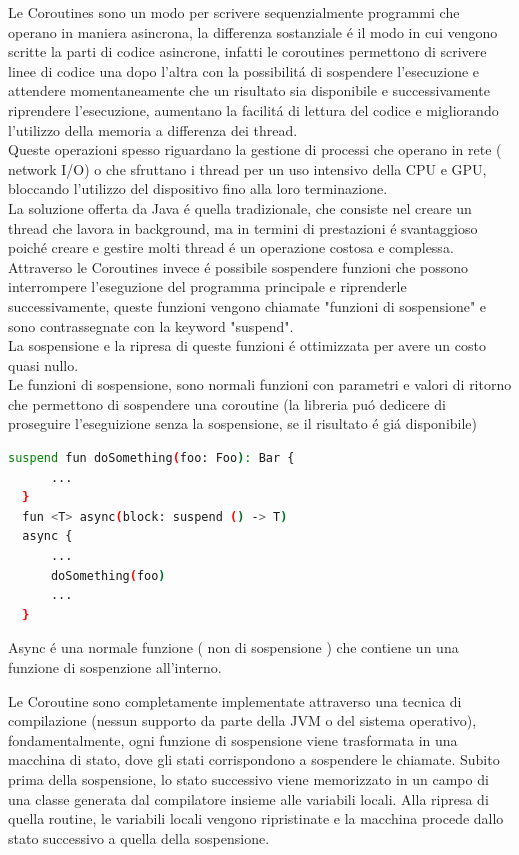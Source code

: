 Le Coroutines sono un modo per scrivere sequenzialmente programmi che operano in maniera asincrona, la differenza sostanziale \'e il modo in cui vengono scritte la parti di codice asincrone, infatti le coroutines permettono di scrivere linee di codice una dopo l'altra con la possibilit\'a di sospendere l'esecuzione e attendere momentaneamente che un risultato sia disponibile e successivamente riprendere l'esecuzione, aumentano la facilit\'a di lettura del codice e migliorando l'utilizzo della memoria a differenza dei thread.\\
Queste operazioni spesso riguardano la gestione di processi che operano in rete ( network I/O) o che sfruttano i thread per un uso intensivo della CPU e GPU, bloccando l'utilizzo del dispositivo fino alla loro terminazione.\\
La soluzione offerta da Java \'e quella tradizionale, che consiste nel creare un thread che lavora in background, ma in termini di prestazioni \'e svantaggioso poich\'e creare e gestire molti thread \'e un operazione costosa e complessa.\\
Attraverso le Coroutines invece \'e possibile sospendere funzioni che possono interrompere l'eseguzione del programma principale e riprenderle successivamente, queste funzioni vengono chiamate "funzioni di sospensione" e sono contrassegnate con la keyword "suspend".\\
La sospensione e la ripresa di queste funzioni \'e ottimizzata per avere un costo quasi nullo.\\

Le funzioni di sospensione, sono normali funzioni con parametri e valori di ritorno che permettono di sospendere una coroutine (la libreria pu\'o dedicere di proseguire l'eseguizione senza la sospensione, se il risultato \'e gi\'a disponibile)

\begin{lstlisting}[language=bash,caption={Grandle Coroutines }]
  suspend fun doSomething(foo: Foo): Bar {
      ...
  }
  fun <T> async(block: suspend () -> T)
  async {
      ...
      doSomething(foo)
      ...
  }

\end{lstlisting}

Async \'e una normale funzione ( non di sospensione ) che contiene un una funzione di sospenzione all'interno.

Le Coroutine sono completamente implementate attraverso una tecnica di compilazione (nessun supporto da parte della JVM o del sistema operativo), fondamentalmente, ogni funzione di sospensione viene trasformata in una macchina di stato, dove gli stati corrispondono a sospendere le chiamate. Subito prima della sospensione, lo stato successivo viene memorizzato in un campo di una classe generata dal compilatore insieme alle variabili locali. Alla ripresa di quella routine, le variabili locali vengono ripristinate e la macchina procede dallo stato successivo a quella della sospensione.\\

